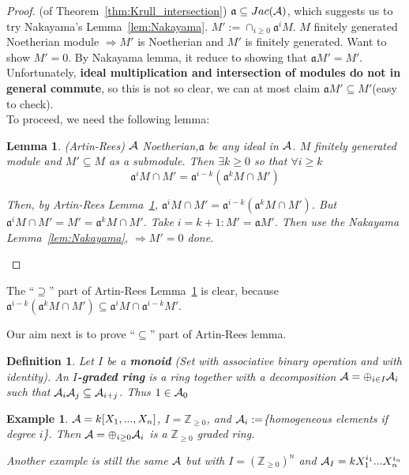 \documentclass[11pt]{article}
\newtheorem{lemma}[thm]{Lemma}
\newtheorem{dfn}[thm]{Definition}
\newtheorem{ex}[thm]{Example}
\newcommand{\intg}{\mathbb Z}
\newcommand{\sca}{{\mathfrak a}}
\newcommand{\cala}{{\cal A}}
\newcommand{\Lrta}{\Longrightarrow}
\begin{document}
\begin{proof}(of Theorem~\ref{thm:Krull_intersection})
$\sca\subseteq Jac(\cala)$, which suggests us to  try Nakayama's Lemma~\ref{lem:Nakayama}.
$M':=\cap_{i\geq 0}\sca^i M.$ $M$ finitely generated Noetherian module $\Lrta M'$ is Noetherian and $M'$ is finitely generated. Want to show $M'=0$. By Nakayama lemma, it reduce to showing that $\sca M'=M'$.\\
Unfortunately, \textbf{ideal multiplication and intersection of modules do not in general commute}, so this is not so clear, we can at most claim $\sca M'\subseteq M'$(easy to check).\\ 
To proceed, we need the following lemma:
\begin{lemma}\label{lem:Artin-Rees}
(Artin-Rees) $\cala$ Noetherian,$\sca$ be any ideal in $\cala$. $M$ finitely generated module and $M'\subseteq M$ as a submodule. Then $\exists k\geq 0 $ so that $\forall i\geq k$
$$
\sca^i M\cap M'=\sca^{i-k}(\sca^k M\cap M')
$$

Then, by Artin-Rees Lemma~\ref{lem:Artin-Rees}, $\sca^i M\cap M'=\sca^{i-k}(\sca^k M\cap M')$. But $\sca^i M\cap M'=M'=\sca^k M\cap M'$. Take $i=k+1: M'=\sca M'$. Then use the Nakayama Lemma~\ref{lem:Nakayama}, $\Lrta M'=0$   done.
\end{lemma}
\end{proof}

The ``$\supseteq$'' part of Artin-Rees Lemma~\ref{lem:Artin-Rees} is clear, because $\sca^{i-k}(\sca^k M\cap M')\subseteq \sca^i M\cap\sca^{i-k}M'$.

Our aim next is to prove ``$\subseteq $'' part of Artin-Rees lemma.
\begin{dfn}
Let $I$ be a \textbf{monoid} (Set with associative binary operation and with identity). An \textbf{$I$-graded ring} is a ring together with a decomposition $\cala=\oplus_{i\in I}\cala_i$ such that $\cala_i\cala_j\subseteq \cala_{i+j}$. Thus $1\in \cala_0$
\end{dfn}

\begin{ex}
$\cala=k[X_1,...,X_n]$, $I=\intg_{\geq 0}$, and $\cala_i:=$\{homogeneous elements if degree $i$\}. Then $\cala=\oplus_{i\geq 0}\cala_i$ is a $\intg_{\geq 0}$ graded ring.

Another example is still the same $\cala$ but with $I=(\intg_{\geq 0})^n$ and $\cala_I=k X_1^{i_1}...X_n^{i_n}$
\end{ex}
\end{document}
